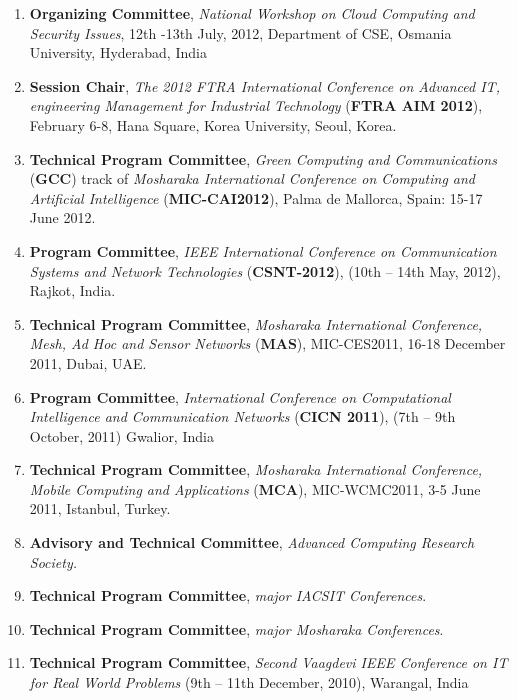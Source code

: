 \begin{enumerate}
\item
\textbf{Organizing Committee}, \textit{National Workshop on Cloud Computing and Security Issues}, 12th -13th July, 2012, Department of CSE, Osmania University, Hyderabad, India

\item
\textbf{Session Chair}, \textit{The 2012 FTRA International Conference on Advanced IT, engineering Management for Industrial Technology} (\textbf{FTRA AIM 2012}), February 6-8, Hana Square, Korea University, Seoul, Korea.

\item
\textbf{Technical Program Committee}, \textit{Green Computing and Communications} (\textbf{GCC}) track of \textit{Mosharaka International Conference on Computing and Artificial Intelligence} (\textbf{MIC-CAI2012}), Palma de Mallorca, Spain: 15-17 June 2012. 

\item
\textbf{Program Committee}, \textit{IEEE International Conference on Communication Systems and Network Technologies} (\textbf{CSNT-2012}), (10th – 14th May, 2012), Rajkot, India.

\item
\textbf{Technical Program Committee}, \textit{Mosharaka International Conference, Mesh, Ad Hoc and Sensor Networks} (\textbf{MAS}), MIC-CES2011, 16-18 December 2011, Dubai, UAE.

\item
\textbf{Program Committee}, \textit{International Conference on Computational Intelligence and Communication Networks }(\textbf{CICN 2011}), (7th – 9th October, 2011) Gwalior, India

\item
\textbf{Technical Program Committee}, \textit{Mosharaka International Conference, Mobile Computing and Applications} (\textbf{MCA}), MIC-WCMC2011, 3-5 June 2011, Istanbul, Turkey.

\item
\textbf{Advisory and Technical Committee}, \textit{Advanced Computing Research Society.}

\item
\textbf{Technical Program Committee}, \textit{major IACSIT Conferences}.

\item
\textbf{Technical Program Committee}, \textit{major Mosharaka Conferences}.

\item
\textbf{Technical Program Committee}, \textit{Second Vaagdevi IEEE Conference on IT for Real World Problems} (9th – 11th December, 2010), Warangal, India


\end{enumerate}
